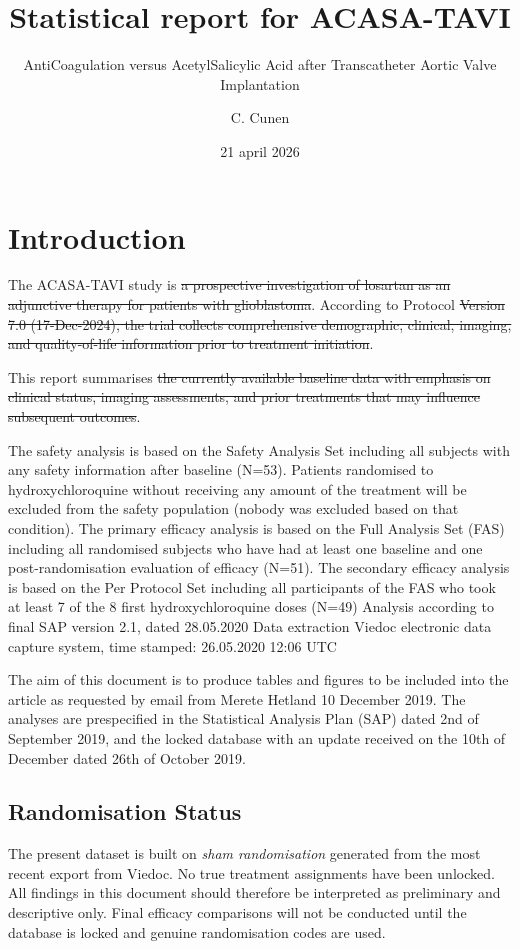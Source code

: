 \documentclass[
]{article}
\title{Statistical report for ACASA-TAVI}
\subtitle{AntiCoagulation versus AcetylSalicylic Acid after
Transcatheter Aortic Valve Implantation}
\author{C. Cunen}
\date{21 april 2026}
\begin{document}
\maketitle

{
\setcounter{tocdepth}{2}
\tableofcontents
}
\section{Introduction}\label{introduction}

The ACASA-TAVI study is \st{a prospective investigation of losartan as
an adjunctive therapy for patients with glioblastoma}. According to
Protocol \st{Version 7.0 (17-Dec-2024), the trial collects comprehensive
demographic, clinical, imaging, and quality-of-life information prior to
treatment initiation}.

This report summarises \st{the currently available baseline data with
emphasis on clinical status, imaging assessments, and prior treatments
that may influence subsequent outcomes}.

The safety analysis is based on the Safety Analysis Set including all
subjects with any safety information after baseline (N=53). Patients
randomised to hydroxychloroquine without receiving any amount of the
treatment will be excluded from the safety population (nobody was
excluded based on that condition). The primary efficacy analysis is
based on the Full Analysis Set (FAS) including all randomised subjects
who have had at least one baseline and one post-randomisation evaluation
of efficacy (N=51). The secondary efficacy analysis is based on the Per
Protocol Set including all participants of the FAS who took at least 7
of the 8 first hydroxychloroquine doses (N=49) Analysis according to
final SAP version 2.1, dated 28.05.2020 Data extraction Viedoc
electronic data capture system, time stamped: 26.05.2020 12:06 UTC

The aim of this document is to produce tables and figures to be included
into the article as requested by email from Merete Hetland 10 December
2019. The analyses are prespecified in the Statistical Analysis Plan
(SAP) dated 2nd of September 2019, and the locked database with an
update received on the 10th of December dated 26th of October 2019.

\subsection{Randomisation Status}\label{randomisation-status}

The present dataset is built on \emph{sham randomisation} generated from
the most recent export from Viedoc. No true treatment assignments have
been unlocked. All findings in this document should therefore be
interpreted as preliminary and descriptive only. Final efficacy
comparisons will not be conducted until the database is locked and
genuine randomisation codes are used.
\end{document}
